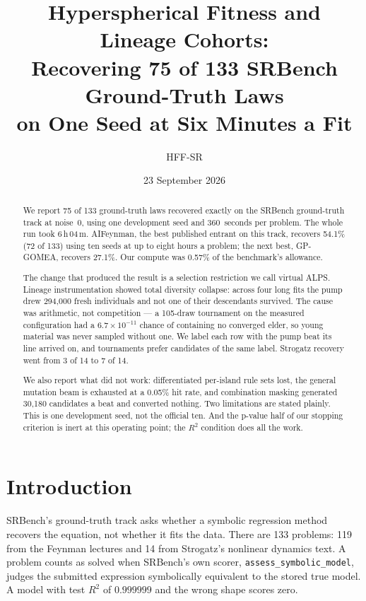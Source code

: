 \documentclass[11pt,a4paper]{article}
\title{Hyperspherical Fitness and Lineage Cohorts:\\
Recovering 75 of 133 SRBench Ground-Truth Laws\\
on One Seed at Six Minutes a Fit}
\author{HFF-SR}
\date{23 September 2026}
\begin{document}
\maketitle

\begin{abstract}
We report 75 of 133 ground-truth laws recovered exactly on the SRBench
ground-truth track at noise~0, using one development seed and 360~seconds per
problem. The whole run took 6\,h\,04\,m. AIFeynman, the best published entrant
on this track, recovers 54.1\% (72 of 133) using ten seeds at up to eight hours
a problem; the next best, GP-GOMEA, recovers 27.1\%. Our compute was 0.57\% of
the benchmark's allowance.

The change that produced the result is a selection restriction we call virtual
ALPS. Lineage instrumentation showed total diversity collapse: across four long
fits the pump drew 294{,}000 fresh individuals and not one of their descendants
survived. The cause was arithmetic, not competition --- a 105-draw tournament on
the measured configuration had a $6.7\times10^{-11}$ chance of containing no
converged elder, so young material was never sampled without one. We label each
row with the pump beat its line arrived on, and tournaments prefer candidates of
the same label. Strogatz recovery went from 3 of 14 to 7 of 14.

We also report what did not work: differentiated per-island rule sets lost,
the general mutation beam is exhausted at a 0.05\% hit rate, and combination
masking generated 30{,}180 candidates a beat and converted nothing. Two
limitations are stated plainly. This is one development seed, not the official
ten. And the p-value half of our stopping criterion is inert at this operating
point; the $R^2$ condition does all the work.
\end{abstract}

\section{Introduction}

SRBench's ground-truth track asks whether a symbolic regression method recovers
the equation, not whether it fits the data. There are 133 problems: 119 from the
Feynman lectures and 14 from Strogatz's nonlinear dynamics text. A problem counts
as solved when SRBench's own scorer, \texttt{assess\_symbolic\_model}, judges the
submitted expression symbolically equivalent to the stored true model. A model
with test $R^2$ of $0.999999$ and the wrong shape scores zero.
\end{document}

